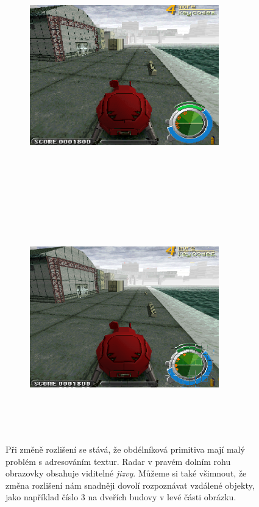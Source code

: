 \begin{figure}[hbt]
    \centering
    \begin{subfigure}{0.9\textwidth}
        \centering
        \includegraphics[width=0.9\textwidth, height=10cm]{obrazky-figures/gits-lowres.png}
        \vspace*{2mm}
    \end{subfigure}
    \begin{subfigure}{0.9\textwidth}
        \centering
        \includegraphics[width=0.9\textwidth, height=10cm]{obrazky-figures/gits-highres.png}
    \end{subfigure}
    \caption[Změna rozlišení u hry \textit{Ghost in the Shell}]{ Při změně rozlišení se stává, že obdélníková primitiva mají malý problém s adresováním textur. Radar v pravém dolním rohu obrazovky obsahuje viditelné \textit{jizvy}. Můžeme si také všimnout, že změna rozlišení nám snadněji dovolí rozpoznávat vzdálené objekty, jako například číslo 3 na dveřích budovy v levé části obrázku. }
    \label{gits-showcase-2}
\end{figure}